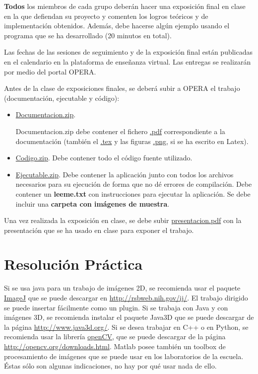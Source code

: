 \documentclass{pid}
\begin{document}
{\bf Todos} los miembros de cada grupo deberán hacer una exposición final en clase en la que defiendan su proyecto y comenten los logros teóricos y de implementación obtenidos. Además, debe hacerse algún ejemplo usando el programa que se ha desarrollado (20 minutos en total).

Las fechas de las sesiones de seguimiento y de la exposición final están publicadas en el calendario en la plataforma de enseñanza virtual. Las entregas se realizarán por medio del portal OPERA.

Antes de la clase de exposiciones finales, se deberá subir a OPERA el trabajo (documentación, ejecutable y código):

 \begin{itemize}
\item \url{Documentacion.zip}.

Documentacion.zip debe contener el fichero \url{.pdf} correspondiente a la documentación (también el \url{.tex} y las figuras \url{.png}, si se ha escrito en Latex). 

\item \url{Codigo.zip}. Debe contener todo el código fuente utilizado.
\item \url {Ejecutable.zip}. Debe contener la aplicación junto con todos los archivos necesarios para su ejecución de forma que no dé errores de compilación.
Debe contener un {\bf leeme.txt} con instrucciones para ejecutar la aplicación.
Se debe incluir una {\bf carpeta con imágenes de muestra}.

\end{itemize}



Una vez realizada la exposición en clase, se debe subir \url{presentacion.pdf} con la presentación que se ha usado en clase para exponer el trabajo.


\section{Resolución Práctica}
Si se usa java para un trabajo de imágenes 2D, se recomienda usar el paquete \url{ImageJ} que se puede descargar en \url{http://rsbweb.nih.gov/ij/}. El trabajo dirigido se puede insertar fácilmente como un plugin. Si se trabaja con Java y con imágenes 3D, se recomienda instalar el paquete Java3D que se puede descargar de la página \url{http://www.java3d.org/}. Si se desea trabajar en C++ o en Python, se recomienda usar la librería \url{openCV}, que se puede descargar de la página \url{http://opencv.org/downloads.html}. Matlab posee también un toolbox de procesamiento de imágenes que se puede usar en los laboratorios de la escuela. Éstas sólo son algunas indicaciones, no hay por qué usar nada de ello.
\end{document}
